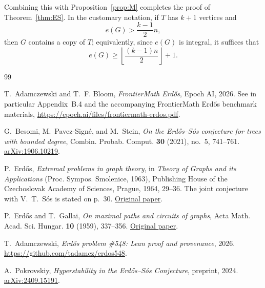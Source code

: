 \documentclass[11pt]{article}
\numberwithin{equation}{section}
\theoremstyle{definition}
\begin{document}
Combining this with Proposition~\ref{prop:M} completes the proof of
Theorem~\ref{thm:ES}.  In the customary notation, if $T$ has $k+1$
vertices and
\[
        e(G)>\frac{k-1}{2}n,
\]
then $G$ contains a copy of $T$; equivalently, since $e(G)$ is integral, it
suffices that
\[
        e(G)\geq \left\lfloor\frac{(k-1)n}{2}\right\rfloor+1.
\]


\begin{thebibliography}{99}

T.~Adamczewski and T.~F. Bloom,
\emph{FrontierMath Erd\H{o}s}, Epoch AI, 2026.
See in particular Appendix~B.4 and the accompanying FrontierMath Erd\H{o}s
benchmark materials, \url{https://epoch.ai/files/frontiermath-erdos.pdf}.

G.~Besomi, M.~Pavez-Sign\'e, and M.~Stein,
\emph{On the Erd\H{o}s--S\'os conjecture for trees with bounded degree},
Combin. Probab. Comput. \textbf{30} (2021), no.~5, 741--761.
\href{https://arxiv.org/abs/1906.10219}{arXiv:1906.10219}.

P.~Erd\H{o}s,
\emph{Extremal problems in graph theory},
in \emph{Theory of Graphs and its Applications}
(Proc. Sympos. Smolenice, 1963),
Publishing House of the Czechoslovak Academy of Sciences, Prague, 1964,
29--36.  The joint conjecture with V.~T.~S\'os is stated on p.~30.
\href{https://users.renyi.hu/~p_erdos/1964-06.pdf}{Original paper}.

P.~Erd\H{o}s and T.~Gallai,
\emph{On maximal paths and circuits of graphs},
Acta Math. Acad. Sci. Hungar. \textbf{10} (1959), 337--356.
\href{https://users.renyi.hu/~p_erdos/1959-10.pdf}{Original paper}.

T.~Adamczewski,
\emph{Erd\H{o}s problem \#548: Lean proof and provenance}, 2026.
\url{https://github.com/tadamcz/erdos548}.

A.~Pokrovskiy,
\emph{Hyperstability in the Erd\H{o}s--S\'os Conjecture},
preprint, 2024.
\href{https://arxiv.org/abs/2409.15191}{arXiv:2409.15191}.

\end{thebibliography}
\end{document}
